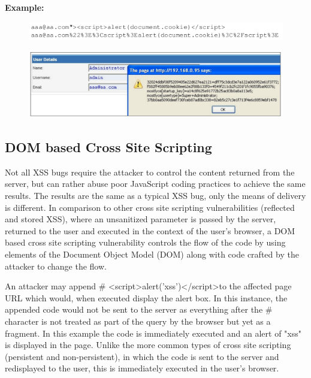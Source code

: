		{\bf Example: }

		\begin{figure}[H]
			\includegraphics[scale=0.5]{pics/link2.png}
		\end{figure}
		\begin{figure}[H]
			\includegraphics[scale=0.5]{pics/xss3.png}
		\end{figure}

	\subsection{DOM based Cross Site Scripting}
		Not all XSS bugs require the attacker to control the content returned from the server, but 
		can rather abuse poor JavaScript coding practices to achieve the same results. 
		The results are the same as a typical XSS bug, only the means of delivery is different.
		In comparison to other cross site scripting vulnerabilities (reflected and stored XSS), 
		where an unsanitized parameter is passed by the server, returned to the user and executed 
		in the context of the user’s browser, a DOM based cross site scripting vulnerability controls 
		the flow of the code by using elements of the Document Object Model (DOM) along with code 
		crafted by the attacker to change the flow.

		An attacker may append \# \textless script\textgreater alert('xss')\textless /script\textgreater to the affected page URL which would, 
		when executed display the alert box. In this instance, the appended code would not be sent 
		to the server as everything after the \# character is not treated as part of the query by 
		the browser but yet as a fragment. In this example the code is immediately executed and an
		alert of "xss" is displayed in the page. Unlike the more common types of cross site scripting 
		(persistent and non-persistent), in which the code is sent to the server and redisplayed to 
		the user, this is immediately executed in the user’s browser.


